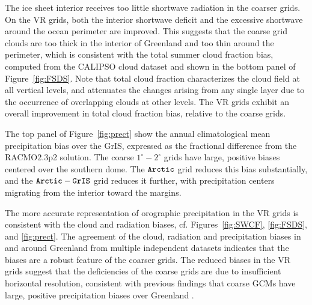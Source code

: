 \documentclass[draft]{agujournal2019}
\begin{document}
The ice sheet interior receives too little shortwave radiation in the coarser grids. On the VR grids, both the interior shortwave deficit and the excessive shortwave around the ocean perimeter are improved. This suggests that the coarse grid clouds are too thick in the interior of Greenland and too thin around the perimeter, which is consistent with the total summer cloud fraction bias, computed from the CALIPSO cloud dataset and shown in the bottom panel of Figure~\ref{fig:FSDS}. Note that total cloud fraction characterizes the cloud field at all vertical levels, and attenuates the changes arising from any single layer due to the occurrence of overlapping clouds at other levels. The VR grids exhibit an overall improvement in total cloud fraction bias, relative to the coarse grids.

The top panel of Figure~\ref{fig:prect} show the annual climatological mean precipitation bias over the GrIS, expressed as the fractional difference from the RACMO2.3p2 solution. The coarse $1^{\circ}-2^{\circ}$ grids have large, positive biases centered over the southern dome. The $\tt Arctic$ grid reduces this bias substantially, and the $\tt Arctic-GrIS$ grid reduces it further, with precipitation centers migrating from the interior toward the margins.

The more accurate representation of orographic precipitation in the VR grids is consistent with the cloud and radiation biases, cf. Figures~\ref{fig:SWCF}, \ref{fig:FSDS}, and \ref{fig:prect}. The agreement of the cloud, radiation and precipitation biases in and around Greenland from multiple independent datasets indicates that the biases are a robust feature of the coarser grids. The reduced biases in the VR grids suggest that the deficiencies of the coarse grids are due to insufficient horizontal resolution, consistent with previous findings that coarse GCMs have large, positive precipitation biases over Greenland \cite{P2000GPC,VETAL2018TC}.
\end{document}
